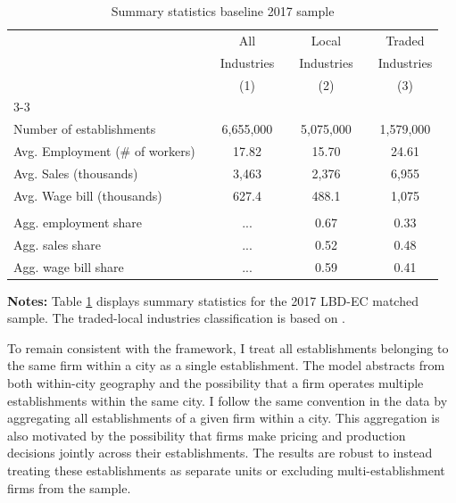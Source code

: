 \begin{table}
	\centering
	\begin{threeparttable}
		\caption{Summary statistics baseline 2017 sample}
		\begin{tabular}{lcccccc}
			\hline
			\hline
			& & All & & Local & & Traded \\
			& & Industries & & Industries & & Industries \\ 
			& &  (1) & & (2) & & (3) \\ \cline{3-3} \cline{5-5} \cline{7-7}
			& & & & & & \\
			Number of establishments & & 6,655,000 & & 5,075,000 & & 1,579,000 \\
			Avg. Employment (\# of workers) & & 17.82 & & 15.70 & & 24.61 \\
			Avg. Sales (thousands) & & 3,463 & & 2,376 & & 6,955 \\
			Avg. Wage bill (thousands) & & 627.4 & & 488.1 & & 1,075 \\
			\hline
			& & & & & & \\
			Agg. employment share & & ... & & 0.67 & & 0.33 \\
			Agg. sales share & & ... & & 0.52 & & 0.48 \\
			Agg. wage bill share & & ... & & 0.59 & & 0.41 \\
			\hline
			\hline
		\end{tabular}%
		\label{tab:t1}
		\begin{tablenotes}
			\item \footnotesize{\textbf{Notes:} Table \ref{tab:t1} displays summary statistics for the 2017 LBD-EC matched sample. The traded-local industries classification is based on \textcite{DelgadoPorter&Stern16}.}
		\end{tablenotes}
	\end{threeparttable}
\end{table}%

To remain consistent with the framework, I treat all establishments belonging to the same firm within a city as a single establishment. The model abstracts from both within-city geography and the possibility that a firm operates multiple establishments within the same city. I follow the same convention in the data by aggregating all establishments of a given firm within a city. This aggregation is also motivated by the possibility that firms make pricing and production decisions jointly across their establishments. The results are robust to instead treating these establishments as separate units or excluding multi-establishment firms from the sample.

